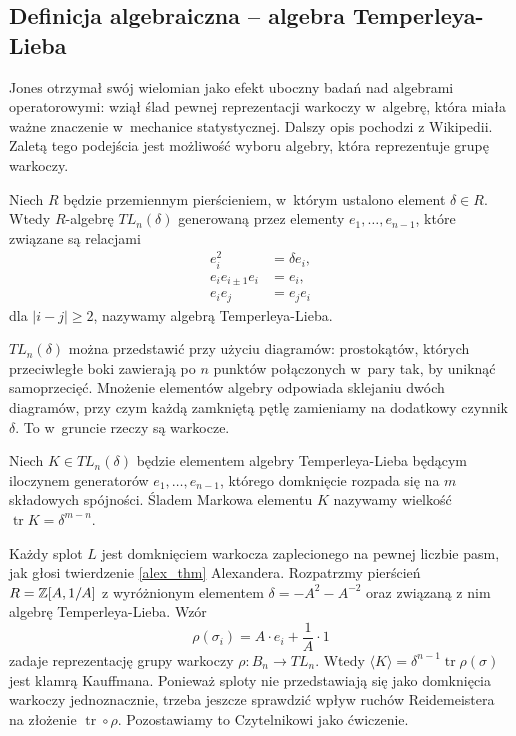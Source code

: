 \subsection{Definicja algebraiczna -- algebra Temperleya-Lieba} %
\label{sub:jones_paper}
Jones otrzymał swój wielomian jako efekt uboczny badań nad algebrami operatorowymi: wziął ślad pewnej reprezentacji warkoczy w~algebrę, która miała ważne znaczenie w~mechanice statystycznej.
Dalszy opis pochodzi z Wikipedii.
Zaletą tego podejścia jest możliwość wyboru algebry, która reprezentuje grupę warkoczy.

\begin{definition}
    Niech $R$ będzie przemiennym pierścieniem, w~którym ustalono element $\delta \in R$.
    Wtedy $R$-algebrę $TL_n(\delta)$ generowaną przez elementy $e_1, \ldots, e_{n-1}$, które związane są relacjami
    \begin{align}
        e_i^2 & = \delta e_i, \\
        e_i e_{i \pm 1} e_i & = e_i, \\
        e_i e_j & = e_j e_i
    \end{align}
    dla $|i-j| \ge 2$, nazywamy algebrą Temperleya-Lieba.
\end{definition}

$TL_n(\delta)$ można przedstawić przy użyciu diagramów: prostokątów, których przeciwległe boki zawierają po $n$ punktów połączonych w~pary tak, by uniknąć samoprzecięć. Mnożenie elementów algebry odpowiada sklejaniu dwóch diagramów, przy czym każdą zamkniętą pętlę zamieniamy na dodatkowy czynnik $\delta$.
To w~gruncie rzeczy są warkocze.

\begin{definition}
    Niech $K \in TL_n(\delta)$ będzie elementem algebry Temperleya-Lieba będącym iloczynem generatorów $e_1, \ldots, e_{n-1}$, którego domknięcie rozpada się na $m$ składowych spójności.
    Śladem Markowa elementu $K$ nazywamy wielkość $\operatorname{tr} K = \delta^{m-n}$.
\end{definition}

Każdy splot $L$ jest domknięciem warkocza zaplecionego na pewnej liczbie pasm, jak głosi twierdzenie \ref{alex_thm} Alexandera.
Rozpatrzmy pierścień $R = \mathbb Z[A, 1/A]$ z wyróżnionym elementem $\delta = -A^2 - A^{-2}$ oraz związaną z nim algebrę Temperleya-Lieba.
Wzór
\begin{equation}
    \rho(\sigma_i) = A \cdot e_i + \frac{1}{A} \cdot 1
\end{equation}
zadaje reprezentację grupy warkoczy $\rho \colon B_n \to TL_n$.
Wtedy $\langle K \rangle = \delta^{n-1} \operatorname{tr} \rho (\sigma)$ jest klamrą Kauffmana.
Ponieważ sploty nie przedstawiają się jako domknięcia warkoczy jednoznacznie, trzeba jeszcze sprawdzić wpływ ruchów Reidemeistera na złożenie $\operatorname{tr} \circ \rho$.
Pozostawiamy to Czytelnikowi jako ćwiczenie.

